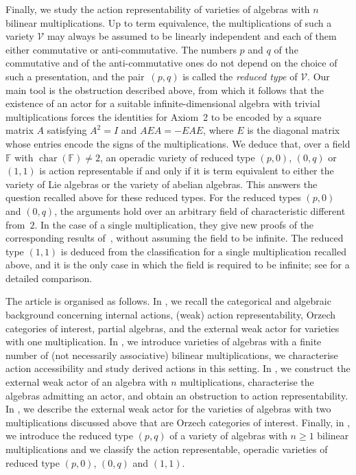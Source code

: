 \documentclass[reqno,a4paper]{amsart}
\theoremstyle{plain}
\theoremstyle{definition}
\theoremstyle{remark}
\numberwithin{equation}{section}
\newcommand{\F}{\mathbb{F}}
\newcommand{\V}{\mathcal{V}}
\DeclareMathOperator{\bchar}{char}
\begin{document}
Finally, we study the action representability of varieties of algebras with $n$ bilinear multiplications. Up to term equivalence, the multiplications of such a variety $\V$ may always be assumed to be linearly independent and each of them either commutative or anti-commutative. The numbers $p$ and $q$ of the commutative and of the anti-commutative ones do not depend on the choice of such a presentation, and the pair~$(p,q)$ is called the \emph{reduced type} of $\V$. Our main tool is the obstruction described above, from which it follows that the existence of an actor for a suitable infinite-dimensional algebra with trivial multiplications forces the identities for Axiom~2 to be encoded by a square matrix $A$ satisfying $A^2=I$ and $AEA=-EAE$, where $E$ is the diagonal matrix whose entries encode the signs of the multiplications. We deduce that, over a field $\F$ with $\bchar(\F)\neq2$, an operadic variety of reduced type $(p,0)$, $(0,q)$ or $(1,1)$ is action representable if and only if it is term equivalent to either the variety of Lie algebras or the variety of abelian algebras. This answers the question recalled above for these reduced types. For the reduced types $(p,0)$ and $(0,q)$, the arguments hold over an arbitrary field of characteristic different from~$2$. In the case of a single multiplication, they give new proofs of the corresponding results of~\cite{Tim}, without assuming the field to be infinite. The reduced type $(1,1)$ is deduced from the classification for a single multiplication recalled above, and it is the only case in which the field is required to be infinite; see  for a detailed comparison.

The article is organised as follows. In , we recall the categorical and algebraic background concerning internal actions, (weak) action representability, Orzech categories of interest, partial algebras, and the external weak actor for varieties with one multiplication. In , we introduce varieties of algebras with a finite number of (not necessarily associative) bilinear multiplications, we characterise action accessibility and study derived actions in this setting. In , we construct the external weak actor of an algebra with $n$ multiplications, characterise the algebras admitting an actor, and obtain an obstruction to action representability. In , we describe the external weak actor for the varieties of algebras with two multiplications discussed above that are Orzech categories of interest. Finally, in , we introduce the reduced type $(p,q)$ of a variety of algebras with $n \geq 1$ bilinear multiplications and we classify the action representable, operadic varieties of reduced type $(p,0)$, $(0,q)$ and $(1,1)$.
\end{document}
